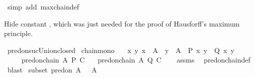 \begin{isabellebody}
%
\isatagproof
{}\isamarkupfalse%
\ {\isacharparenleft}{\kern0pt}simp\ add{\isacharcolon}{\kern0pt}\ maxchain{\isacharunderscore}{\kern0pt}def{\isacharparenright}{\kern0pt}%
\endisatagproof
{\isafoldproof}%
%
\isadelimproof
\isanewline
%
\endisadelimproof
\isanewline
{}\isamarkupfalse%
%
\begin{isamarkuptext}%
Hide constant , which was just needed
  for the proof of Hausforff's maximum principle.%
\end{isamarkuptext}\isamarkuptrue%
\isamarkupfalse%
\ pred{\isacharunderscore}{\kern0pt}on{\isachardot}{\kern0pt}suc{\isacharunderscore}{\kern0pt}Union{\isacharunderscore}{\kern0pt}closed\isanewline
\isanewline
{}\isamarkupfalse%
\ chain{\isacharunderscore}{\kern0pt}mono{\isacharcolon}{\kern0pt}\isanewline
\ \ \ {\isachardoublequoteopen}{\isasymAnd}x\ y{\isachardot}{\kern0pt}\ x\ {\isasymin}\ A\ {\isasymLongrightarrow}\ y\ {\isasymin}\ A\ {\isasymLongrightarrow}\ P\ x\ y\ {\isasymLongrightarrow}\ Q\ x\ y{\isachardoublequoteclose}\isanewline
\ \ \ \ \ {\isachardoublequoteopen}pred{\isacharunderscore}{\kern0pt}on{\isachardot}{\kern0pt}chain\ A\ P\ C{\isachardoublequoteclose}\isanewline
\ \ \ {\isachardoublequoteopen}pred{\isacharunderscore}{\kern0pt}on{\isachardot}{\kern0pt}chain\ A\ Q\ C{\isachardoublequoteclose}\isanewline
%
\isadelimproof
\ \ %
\endisadelimproof
%
\isatagproof
{}\isamarkupfalse%
\ assms\ \isamarkupfalse%
\ pred{\isacharunderscore}{\kern0pt}on{\isachardot}{\kern0pt}chain{\isacharunderscore}{\kern0pt}def\ \isamarkupfalse%
\ blast%
\endisatagproof
{\isafoldproof}%
%
\isadelimproof
%
\endisadelimproof
%
\isadelimdocument
%
\endisadelimdocument
%
\isatagdocument
%
\isamarkuptrue%
%
\endisatagdocument
{\isafolddocument}%
%
\isadelimdocument
%
\endisadelimdocument
{}\isamarkupfalse%
\ subset{\isacharcolon}{\kern0pt}\ pred{\isacharunderscore}{\kern0pt}on\ {\isachardoublequoteopen}A{\isachardoublequoteclose}\ {\isachardoublequoteopen}{\isacharparenleft}{\kern0pt}{\isasymsubset}{\isacharparenright}{\kern0pt}{\isachardoublequoteclose}\ \ A%
\isadelimproof
\ %
\endisadelimproof
%
\isatagproof
\isacommand{{\isachardot}{\kern0pt}}\isamarkupfalse%

\end{isabellebody}
